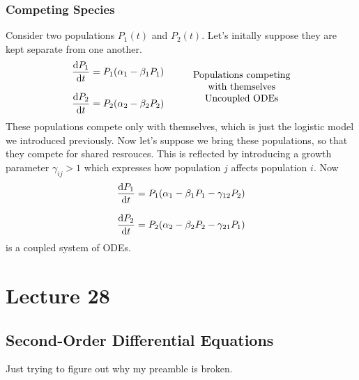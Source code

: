 \documentclass{report}
\begin{document}
\subsubsection*{Competing Species}
Consider two populations $P_1(t)$ and $P_2(t)$. Let's initally suppose they are kept separate from one another.
$$
	\begin{array}{l}
		\dps{\dyd[P_1]{t} = P_1(\alpha_1 - \beta_1P_1)} \\ \\
		\dps{\dyd[P_2]{t} = P_2(\alpha_2 - \beta_2P_2)}
	\end{array} \qquad \begin{array}{c}
		\text{Populations competing} \\
		\text{with themselves} \\
		\text{Uncoupled ODEs}
	\end{array}
$$
These populations compete only with themselves, which is just the logistic model we introduced previously. Now let's suppose we bring these populations, so that they compete for shared resrouces. This is reflected by introducing a growth parameter $\gamma_{ij}>1$ which expresses how population $j$ affects population $i$. Now
$$
	\begin{array}{l}
		\dps{\dyd[P_1]{t} = P_1(\alpha_1 - \beta_1P_1 - \gamma_{12}P_2)} \\ \\
		\dps{\dyd[P_2]{t} = P_2(\alpha_2 - \beta_2P_2 - \gamma_{21}P_1)}
	\end{array} 
$$
is a coupled system of ODEs.

\section{Lecture 28}
\subsection*{Second-Order Differential Equations}
Just trying to figure out why my preamble is broken.
\end{document}
